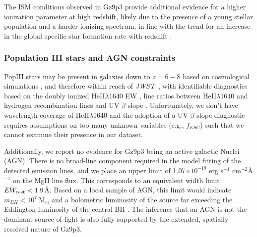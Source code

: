\documentclass[sn-mathphys]{sn-jnl}%
\theoremstyle{thmstyleone}%
\theoremstyle{thmstyletwo}%
\theoremstyle{thmstylethree}%
\newcommand{\jwst}{\textit{JWST}}
\begin{document}
The ISM conditions observed in Gz9p3 provide additional evidence for a higher ionization parameter at high redshift, likely due to the presence of a young stellar population and a harder ionizing spectrum, in line with the trend for an increase in the global specific star formation rate with redshift \citep{Speagle14, Marmol16}.

\subsubsection{Population III stars and AGN constraints}\label{sec:popIII_AGN}
PopIII stars may be present in galaxies down to $z=6-8$ based on cosmological simulations \citep{Venditti23}, and therefore within reach of \jwst\ \citep{Trussler22}, with identifiable diagnostics based on the doubly ionized HeII$\lambda1640$ EW \citep{Schaerer02, Schaerer03, Raiter10}, line ratios between HeII$\lambda1640$ and hydrogen recombination lines \citep{Nakajima_Maiolino22} and UV $\beta$ slope \citep{Raiter10, Zackrisson11}. Unfortunately, we don't have wavelength coverage of HeII$\lambda1640$ and the adoption of a UV $\beta$ slope diagnostic requires assumptions on too many unknown variables (e.g., $f_{ESC}$) such that we cannot examine their presence in our dataset.

Additionally, we report no evidence for Gz9p3 being an active galactic Nuclei (AGN). There is no broad-line component required in the model fitting of the detected emission lines, and we place an upper limit of 1.07$\times10^{-19}$ erg s$^{-1}$ cm$^{-2}$\AA$^{-1}$ on the MgII line flux. This corresponds to an equivalent width limit $EW_{\rm rest}<1.9$\AA. Based on a local sample of AGN, this limit would indicate $m_{BH}<10^7~\mathrm{M_{\odot}}$ and a bolometric luminosity of the source far exceeding the Eddington luminosity of the central BH \cite{Dong09}. The inference that an AGN is not the dominant source of light is also fully supported by the extended, spatially resolved nature of Gz9p3.
\end{document}
